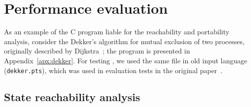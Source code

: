 %


 



\section{Performance evaluation}
\label{ch:eval:perf}

As an example of the C program liable for the reachability and portability analysis, consider the Dekker's algorithm for mutual exclusion of two processes, originally described by Dijkstra~\cite{dijkstra1962over}; the program is presented in Appendix~\ref{apx:dekker}.
For testing \porthos[1], we used the same file in old \porthos{} input language (\texttt{dekker.pts}), which was used in evaluation tests in the original paper~\cite{Porthos17a}.

\subsection{State reachability analysis}
\label{ch:eval:perf:reach}



